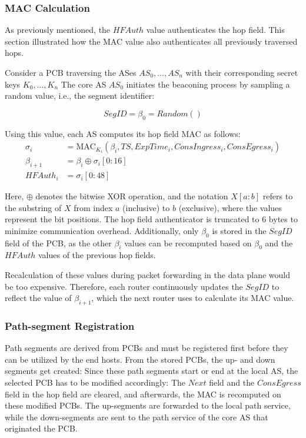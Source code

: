 \subsubsection{MAC Calculation}
\label{sec:mac_calc}
As previously mentioned, the $HFAuth$ value authenticates the hop field.
This section illustrated how the MAC value also authenticates all previously traversed hops.

Consider a PCB traversing the ASes $AS_0, \dots, AS_n$ with their corresponding secret keys $K_0, \dots, K_n$
The core AS $AS_0$ initiates the beaconing process by sampling a random value, i.e., the segment identifier:

$$ SegID = \beta_0 = Random() $$

Using this value, each AS computes its hop field MAC as follows:
\begin{align*}
    \sigma_i    &= \text{MAC}_{K_i}(\beta_i, TS, ExpTime_i, ConsIngress_i, ConsEgress_i) \\
    \beta_{i+1} &= \beta_i \oplus \sigma_i[0:16] \\
    HFAuth_i &= \sigma_i[0:48]
\end{align*}

Here, $\oplus$ denotes the bitwise XOR operation, and the notation $X[a:b]$ refers to the substring of $X$ from index $a$ (inclusive) to $b$ (exclusive), where the values represent the bit positions.
The hop field authenticator is truncated to 6 bytes to minimize communication overhead.
Additionally, only $\beta_0$ is stored in the $SegID$ field of the PCB, as the other $\beta_i$ values can be recomputed based on $\beta_0$ and the $HFAuth$ values of the previous hop fields.

Recalculation of these values during packet forwarding in the data plane would be too expensive.
Therefore, each router continuously updates the $SegID$ to reflect the value of $\beta_{i+1}$, which the next router uses to calculate its MAC value.

\subsubsection{Path-segment Registration}
Path segments are derived from PCBs and must be registered first before they can be utilized by the end hosts.
From the stored PCBs, the up- and down segments get created:
Since these path segments start or end at the local AS, the selected PCB has to be modified accordingly:
The $Next$ field and the $ConsEgress$ field in the hop field are cleared, and afterwards, the MAC is recomputed on these modified PCBs.
The up-segments are forwarded to the local path service, while the down-segments are sent to the path service of the core AS that originated the PCB.

